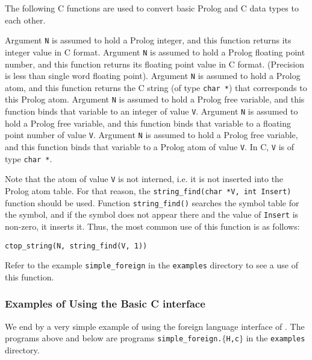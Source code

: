 The following C functions are used to convert basic Prolog and C data types
to each other.
\begin{description}
        Argument {\tt N} is assumed to hold a Prolog integer, and this
        function returns its integer value in C format.
        Argument {\tt N} is assumed to hold a Prolog floating point number,
        and this function returns its floating point value in C format.
        (Precision is less than single word floating point).
        Argument {\tt N} is assumed to hold a Prolog atom, and this
        function returns the C string (of type {\tt char *}) that 
        corresponds to this Prolog atom.
        Argument {\tt N} is assumed to hold a Prolog free variable, and
        this function binds that variable to an integer of value {\tt V}.
        Argument {\tt N} is assumed to hold a Prolog free variable, and
        this function binds that variable to a floating point number of 
        value {\tt V}.
        Argument {\tt N} is assumed to hold a Prolog free variable, and
        this function binds that variable to a Prolog atom of value {\tt V}.
        In C, {\tt V} is of type {\tt char *}.

	Note that the atom of value {\tt V} is not interned, i.e. it is 
	not inserted into the Prolog atom table.  For that reason, the
	{\tt string\_find(char *V, int Insert)} function should be used.
        Function {\tt string\_find()} searches the symbol table for
        the symbol, and if the symbol does not appear there and the
	value of {\tt Insert} is non-zero, it inserts it.  Thus, the most
	common use of this function is as follows:
	\begin{center}
	{\tt	ctop\_string(N, string\_find(V, 1))	}
	\end{center}
	Refer to the example {\tt simple\_foreign} in the {\tt examples}
	directory to see a use of this function.
\end{description}

\subsubsection*{Examples of Using the Basic C interface}

We end by a very simple example of using the foreign language
interface of \ourprolog.  The programs above and below are programs
{\tt simple\_foreign.$\{$H,c$\}$} in the {\tt examples} directory.

